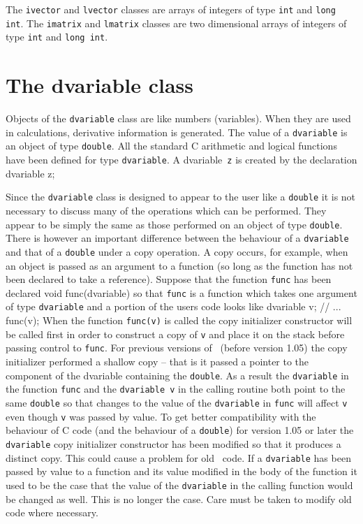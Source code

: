 \documentclass[12pt]{book}
\begin{document}
The {\tt ivector} and {\tt lvector} 
classes are arrays of integers of type
{\tt int} and {\tt long int}.
The {\tt imatrix} and {\tt lmatrix} classes are two dimensional 
arrays of integers of type {\tt int} and {\tt long int}.

\section{The dvariable class}

Objects of the {\tt dvariable} class are like numbers (variables).
When they are used in calculations, derivative information is generated. 
 The value of a {\tt dvariable} is
an object of type {\tt double}. All the standard C arithmetic and logical
functions have been defined for type {\tt dvariable}. 
A \hbox{dvariable {\tt z}} is created by the declaration
\beginexamplea
dvariable z;
\endexample

Since the {\tt dvariable} class is designed to appear to the user like
a {\tt double}  it is not necessary to discuss many of the operations which
can be performed. They appear to be simply the same as those performed
on an object of type {\tt double}.  There is however an important difference
between the behaviour of a {\tt dvariable} and that of a {\tt double}
under a copy operation. A copy occurs, for example, when an 
object is passed as an argument
to a function (so long as the function has not been declared to take
a reference). Suppose that the function {\tt func} has been declared
\beginexamplea
void func(dvariable)
\endexample
\noindent so that {\tt func} is a function which takes one argument of 
type {\tt dvariable} and a portion of the users code looks like
\beginexamplea
dvariable v;
// ...
func(v);
\endexample
{}
When  the function {\tt func(v)} is called the copy initializer constructor
will be called first in order to construct a copy of {\tt v} and place it on 
the stack before passing control to
{\tt func}. For previous versions of \AD\ (before version 1.05) 
the copy initializer performed a 
shallow copy -- that is it
passed a pointer to the component of the dvariable containing the 
{\tt double}. As a result the {\tt dvariable} in the function {\tt func}
and the {\tt dvariable v} in the calling routine both point to the same
{\tt double} so that  changes to the value of the {\tt dvariable}
in {\tt func} will affect {\tt v} even though {\tt v} was passed by value.
To get better compatibility with the behaviour of C code (and the behaviour
of a {\tt double}) for version 1.05 or later the {\tt dvariable} copy initializer constructor has
been modified so that it produces a distinct copy. This could cause
a problem for old \AD\ code. If a {\tt dvariable} has been passed by
value to a function and its value modified in the body of the function
it used to be the case that the value of the {\tt dvariable} in the
calling function would be changed as well. This is no longer the case.
Care must be taken to modify old code where necessary. 
\end{document}
